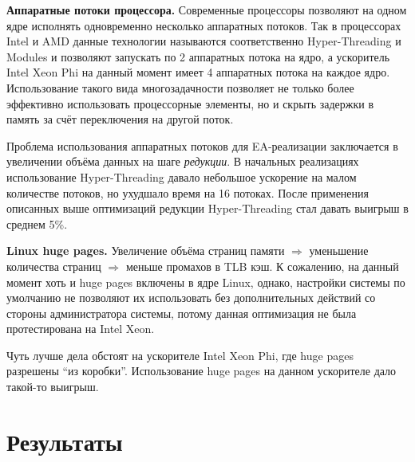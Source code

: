 \documentclass[a4paper,10pt]{extarticle}
\begin{document}
\textbf{Аппаратные потоки процессора.}
Современные процессоры позволяют на одном ядре исполнять одновременно несколько аппаратных потоков. Так в процессорах Intel и AMD данные технологии называются соответственно Hyper-Threading и Modules и позволяют запускать по 2 аппаратных потока на ядро, а ускоритель Intel Xeon Phi на данный момент имеет 4 аппаратных потока на каждое ядро. Использование такого вида многозадачности позволяет не только более эффективно использовать процессорные элементы, но и скрыть задержки в память за счёт переключения на другой поток.

Проблема использования аппаратных потоков для EA-реализации заключается в увеличении объёма данных на шаге \textit{редукции}. В начальных реализациях использование Hyper-Threading давало небольшое
ускорение на малом количестве потоков, но ухудшало время на 16 потоках. После применения описанных выше оптимизаций редукции Hyper-Threading стал давать выигрыш в среднем 5\%.



\textbf{Linux huge pages.}
Увеличение объёма страниц памяти $\Rightarrow$ уменьшение количества страниц $\Rightarrow$ меньше промахов в TLB кэш.
К сожалению, на данный момент хоть и huge pages включены в ядре Linux, однако, настройки системы по умолчанию не позволяют их использовать без дополнительных действий со стороны администратора системы, потому данная оптимизация не была протестирована на Intel Xeon.

Чуть лучше дела обстоят на ускорителе Intel Xeon Phi, где huge pages разрешены ``из коробки''. Использование huge pages на данном ускорителе дало такой-то выигрыш.

\newpage
\section{Результаты}
\label{sec:results}

\end{document}
